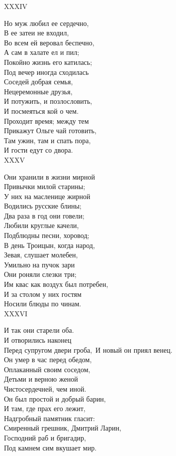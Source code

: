 XXXIV

Но муж любил ее сердечно,\\
В ее затеи не входил,\\
Во всем ей веровал беспечно,\\
А сам в халате ел и пил;\\
Покойно жизнь его катилась;\\
Под вечер иногда сходилась\\
Соседей добрая семья,\\
Нецеремонные друзья,\\
И потужить, и позлословить,\\
И посмеяться кой о чем.\\
Проходит время; между тем\\
Прикажут Ольге чай готовить,\\
Там ужин, там и спать пора,\\
И гости едут со двора.\\

XXXV

Они хранили в жизни мирной\\
Привычки милой старины;\\
У них на масленице жирной\\
Водились русские блины;\\
Два раза в год они говели;\\
Любили круглые качели,\\
Подблюдны песни, хоровод;\\
В день Троицын, когда народ,\\
Зевая, слушает молебен,\\
Умильно на пучок зари\\
Они роняли слезки три;\\
Им квас как воздух был потребен,\\
И за столом у них гостям\\
Носили блюды по чинам.\\

XXXVI

И так они старели оба.\\
И отворились наконец\\
Перед супругом двери гроба,\
И новый он приял венец.\\
Он умер в час перед обедом,\\
Оплаканный своим соседом,\\
Детьми и верною женой\\
Чистосердечней, чем иной.\\
Он был простой и добрый барин,\\
И там, где прах его лежит,\\
Надгробный памятник гласит:\\
Смиренный грешник, Дмитрий Ларин,\\
Господний раб и бригадир,\\
Под камнем сим вкушает мир.\\

